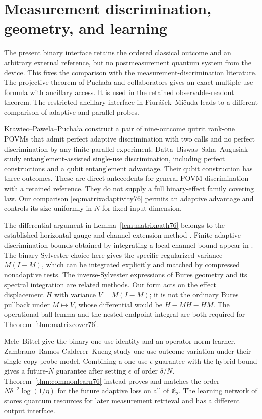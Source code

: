 \section{Measurement discrimination, geometry, and learning}
\label{sec:matrixcomparison76}
The present binary interface retains the ordered classical outcome
and an arbitrary external reference, but no postmeasurement quantum
system from the device. This fixes the comparison with the
measurement-discrimination literature. The projective theorem of
Pucha\l a and collaborators \cite[Corollary~1 and Theorem~2]{PPKKO72}
gives an exact multiple-use formula with ancillary access. It is
used in the retained observable-readout theorem. The restricted
ancillary interface in Fiur\'a\v sek--Mi\v cuda \cite{FM75} leads
to a different comparison of adaptive and parallel probes.

Krawiec--Pawela--Pucha\l a \cite[Section~4]{KPP76} construct a pair
of nine-outcome qutrit rank-one POVMs that admit perfect adaptive
discrimination with two calls and no perfect discrimination by
any finite parallel experiment. Datta--Biswas--Saha--Augusiak
\cite[Theorems~3--5]{DBSA76} study entanglement-assisted
single-use discrimination, including perfect constructions and a
qubit entanglement advantage. Their qubit construction has three
outcomes. These are direct antecedents for general POVM
discrimination with a retained reference. They do not supply a
full binary-effect family covering law. Our comparison
\eqref{eq:matrixadaptivity76} permits an adaptive advantage and
controls its size uniformly in $N$ for fixed input dimension.

The differential argument in Lemma~\ref{lem:matrixpath76} belongs
to the established horizontal-gauge and channel-extension method
\cite{FI76,DKG67,DM76,KGAD76}. Finite adaptive discrimination
bounds obtained by integrating a local channel bound appear in
\cite{YF76,SD76}. The binary Sylvester choice here gives the
specific regularized variance $M(I-M)$, which can be integrated
explicitly and matched by compressed nonadaptive tests. The
inverse-Sylvester expressions of Bures geometry
\cite{Dittmann76} and its spectral integration
\cite{SZGeom76} are related methods. Our form acts on the effect
displacement $H$ with variance $V=M(I-M)$; it is not the ordinary
Bures pullback under $M\mapsto V$, whose differential would be
$H-MH-HM$. The operational-ball lemma and the nested endpoint
integral are both required for Theorem~\ref{thm:matrixcover76}.

Mele--Bittel \cite[Lemmas III.7--III.8 and Corollary III.9]{MB67}
give the binary one-use identity and an operator-norm learner.
Zambrano--Ramos-Calderer--Kueng \cite{ZRK76} study one-use outcome
variation under their single-copy probe model. Combining a
one-use $\epsilon$ guarantee with the hybrid bound gives a
future-$N$ guarantee after setting $\epsilon$ of order
$\delta/N$. Theorem~\ref{thm:commonlearn76} instead proves and
matches the order $N\delta^{-2}\log(1/\eta)$ for the future
adaptive loss on all of $\mathfrak E_2$. The learning network of
\cite{BDPS76} stores quantum resources for later measurement
retrieval and has a different output interface.

